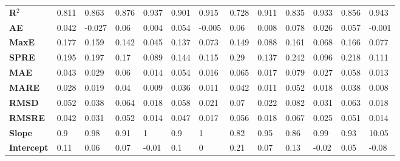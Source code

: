 \begin{landscape}
\begin{table}[t]
{\begin{tabular}{ 	p{2.5cm}|p{1.1cm}p{1.1cm}|p{1.1cm}p{1.1cm}|p{1.1cm}p{1.1cm}|p{1.1cm}p{1.1cm}|p{1.1cm}p{1.1cm}|p{1.1cm}p{1.1cm} }
				\hline
				\textbf{R$^2$} & 0.811           & 0.863           & 0.876           & 0.937           & 0.901            & 0.915           & 0.728            & 0.911           & 0.835            & 0.933            & 0.856            & 0.943           \\
				\textbf{AE}                  & 0.042           & -0.027          & 0.06            & 0.004           & 0.054            & -0.005          & 0.06             & 0.008           & 0.078            & 0.026            & 0.057            & -0.001          \\
				\textbf{MaxE}                & 0.177           & 0.159           & 0.142           & 0.045           & 0.137            & 0.073           & 0.149            & 0.088           & 0.161            & 0.068            & 0.166            & 0.077           \\
				\textbf{SPRE}                & 0.195           & 0.197           & 0.17            & 0.089           & 0.144            & 0.115           & 0.29             & 0.137           & 0.242            & 0.096            & 0.218            & 0.111           \\
				\textbf{MAE}                 & 0.043           & 0.029           & 0.06            & 0.014           & 0.054            & 0.016           & 0.065            & 0.017           & 0.079            & 0.027            & 0.058            & 0.013           \\
				\textbf{MARE}                & 0.028           & 0.019           & 0.04            & 0.009           & 0.036            & 0.011           & 0.042            & 0.011           & 0.052            & 0.018            & 0.038            & 0.008           \\
				\textbf{RMSD}                & 0.052           & 0.038           & 0.064           & 0.018           & 0.058            & 0.021           & 0.07             & 0.022           & 0.082            & 0.031            & 0.063            & 0.018           \\
				\textbf{RMSRE}               & 0.042           & 0.031           & 0.052           & 0.014           & 0.047            & 0.017           & 0.056            & 0.018           & 0.067            & 0.025            & 0.051            & 0.014           \\
				\textbf{Slope}               & 0.9             & 0.98            & 0.91            & 1               & 0.9              & 1               & 0.82             & 0.95            & 0.86             & 0.99             & 0.93             & 10.05            \\
				\textbf{Intercept}           & 0.11            & 0.06            & 0.07            & -0.01           & 0.1              & 0               & 0.21             & 0.07            & 0.13             & -0.02            & 0.05             & -0.08          
			\end{tabular}}
		\end{table}
	\end{landscape}

